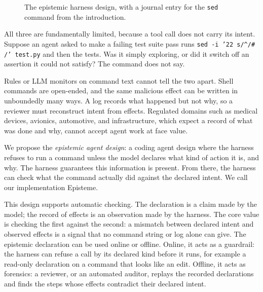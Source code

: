 \documentclass{IEEEcsmag}
\newcommand{\toolname}{{\sc Episteme}\xspace}
\begin{document}
\begin{figure}[t]
\caption{The epistemic harness design, with a journal entry for the \texttt{sed} command from the introduction.}
\label{fig:design}
\end{figure}



All three are fundamentally limited, because a tool call does not carry its intent. Suppose an agent asked to make a failing test suite pass runs \texttt{sed -i '22 s/\^{}/\# /' test.py} and then the tests. Was it simply exploring, or did it switch off an assertion it could not satisfy? The command does not say. 

Rules or LLM monitors on command text cannot tell the two apart. Shell commands are open-ended, and the same malicious effect can be written in unboundedly many ways. A log records what happened but not why, so a reviewer must reconstruct intent from effects. Regulated domains such as medical devices, avionics, automotive, and infrastructure, which expect a record of what was done and why, cannot accept agent work at face value.

We propose the \emph{epistemic agent design}: a coding agent design where the harness refuses to run a command unless the model declares what kind of action it is, and why. The harness guarantees this information is present. From there, the harness can check what the command actually did against the declared intent.
We call our implementation \toolname.

This design supports automatic checking.
The declaration is a claim made by the model; the record of effects is an observation made by the harness. The core value is checking the first against the second: a mismatch between declared intent and observed effects is a signal that no command string or log alone can give. 
The epistemic declaration can be used online or offline. Online, it acts as a guardrail: the harness can refuse a call by its declared kind before it runs, for example a read-only declaration on a command that looks like an edit. Offline, it acts as forensics: a reviewer, or an automated auditor, replays the recorded declarations and finds the steps whose effects contradict their declared intent.
\end{document}
